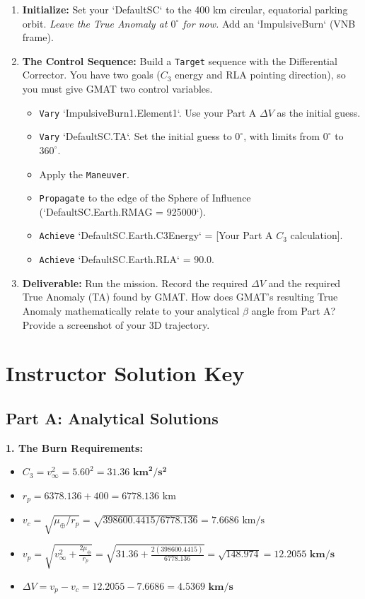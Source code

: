 \documentclass[12pt]{article}
\begin{document}
\begin{enumerate}
    \item \textbf{Initialize:} Set your `DefaultSC` to the 400 km circular, equatorial parking orbit. \textit{Leave the True Anomaly at $0^\circ$ for now.} Add an `ImpulsiveBurn` (VNB frame).
    \item \textbf{The Control Sequence:} Build a \texttt{Target} sequence with the Differential Corrector. You have two goals ($C_3$ energy and RLA pointing direction), so you must give GMAT two control variables.
        \begin{itemize}
            \item \texttt{Vary} `ImpulsiveBurn1.Element1`. Use your Part A $\Delta V$ as the initial guess.
            \item \texttt{Vary} `DefaultSC.TA`. Set the initial guess to $0^\circ$, with limits from $0^\circ$ to $360^\circ$.
            \item Apply the \texttt{Maneuver}.
            \item \texttt{Propagate} to the edge of the Sphere of Influence (`DefaultSC.Earth.RMAG = 925000`).
            \item \texttt{Achieve} `DefaultSC.Earth.C3Energy` = [Your Part A $C_3$ calculation].
            \item \texttt{Achieve} `DefaultSC.Earth.RLA` = 90.0.
        \end{itemize}
    \item \textbf{Deliverable:} Run the mission. Record the required $\Delta V$ and the required True Anomaly (TA) found by GMAT. How does GMAT's resulting True Anomaly mathematically relate to your analytical $\beta$ angle from Part A? Provide a screenshot of your 3D trajectory.
\end{enumerate}

\newpage

\section*{Instructor Solution Key}

\subsection*{Part A: Analytical Solutions}
\textbf{1. The Burn Requirements:}
\begin{itemize}
    \item $C_3 = v_\infty^2 = 5.60^2 = \mathbf{31.36 \text{ km}^2/\text{s}^2}$
    \item $r_p = 6378.136 + 400 = 6778.136 \text{ km}$
    \item $v_c = \sqrt{\mu_\oplus / r_p} = \sqrt{398600.4415 / 6778.136} = 7.6686 \text{ km/s}$
    \item $v_p = \sqrt{v_\infty^2 + \frac{2\mu_\oplus}{r_p}} = \sqrt{31.36 + \frac{2(398600.4415)}{6778.136}} = \sqrt{148.974} = \mathbf{12.2055 \text{ km/s}}$
    \item $\Delta V = v_p - v_c = 12.2055 - 7.6686 = \mathbf{4.5369 \text{ km/s}}$
\end{itemize}
\end{document}
